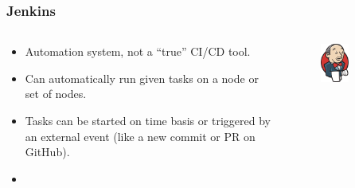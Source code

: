 \documentclass[aspectratio=169]{beamer}
\begin{document}
\begin{frame}
	\frametitle{Jenkins}
	
	\begin{columns}
\begin{column}{0.6\textwidth}
	\begin{block}{}
		\begin{itemize}
			\item Automation system, not a “true” CI/CD tool.
			\item Can automatically run given tasks on a node or set of nodes.
			\item Tasks can be started on time basis or triggered by an external event (like a new commit or PR on GitHub).
			\item {}

		\end{itemize}
	\end{block}
\end{column}
\begin{column}{0.4\textwidth}
	\begin{figure}[ht!]
	\begin{center}
  	  \includegraphics[width=0.5\textwidth]{img/jenkins.png}
	\end{center}
	\end{figure}
\end{column}
\end{columns}
\end{frame}
\end{document}
